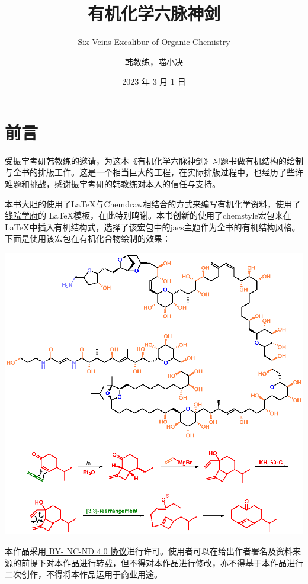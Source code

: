 \documentclass[
  10pt,
  twoside,
  openany,
  b5paper, %
  colorscheme = basic, %
]{qyxf-book}
\title{有机化学六脉神剑}
\subtitle{Six Veins Excalibur of Organic Chemistry }  %
\author{韩教练，喵小决}
\date{2023 年 3 月 1 日}
\begin{document}
\maketitle

\chapter*{前言}

受振宇考研韩教练的邀请，为这本《有机化学六脉神剑》习题书做有机结构的绘制与全书的排版工作。这是一个相当巨大的工程，在实际排版过程中，也经历了些许难题和挑战，感谢振宇考研的韩教练对本人的信任与支持。

本书大胆的使用了\LaTeX 与Chemdraw相结合的方式来编写有机化学资料，使用了\href{https://github.com/qyxf/qyxf-book}{钱院学府}的 \LaTeX 模板，在此特别鸣谢。本书创新的使用了chemstyle宏包来在\LaTeX 中插入有机结构式，选择了该宏包中的jacs主题作为全书的有机结构风格。下面是使用该宏包在有机化合物绘制的效果：

\begin{scheme}[ht]
	\includegraphics{eg/eg1.eps}
\end{scheme}



本作品采用\href{https://
	creativecommons.org/licenses/
	by-nc-nd/4.0/}{ BY-
	NC-ND 4.0 协议}进行许可。使用者可以在给出作者署名及资料来源的前提下对本作品进行转载，但不得对本作品进行修改，亦不得基于本作品进行二次创作，不得将本作品运用于商业用途。
\end{document}
